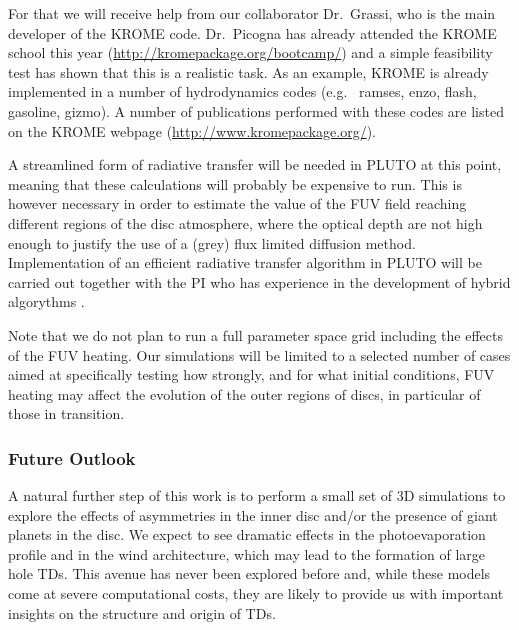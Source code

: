 \documentclass[10pt,fleqn,twoside]{article}
\begin{document}
 For 
that we will receive help from our collaborator Dr.\ Grassi, who is the main
developer of the KROME code. Dr.\ Picogna has already attended the KROME
school this year (\url{http://kromepackage.org/bootcamp/}) and a simple
feasibility test has shown that this is a realistic task. As an example,
KROME is already implemented in a number of hydrodynamics codes (e.g.\ {\sc
  ramses, enzo, flash, gasoline, gizmo}). A number of publications performed
with these codes are listed on the KROME webpage
(\url{http://www.kromepackage.org/}).

A streamlined form of radiative transfer
will be needed in PLUTO at this point, meaning that these calculations will
probably be expensive to run.  This is however necessary in order to
estimate the value of the  FUV field reaching different regions of the
disc atmosphere, where the optical depth are not high enough to
justify the use of a  (grey) flux limited diffusion method.
Implementation of an efficient radiative transfer algorithm in PLUTO
will be carried out together with the PI who has experience in the
development of hybrid algorythms 
\citep[e.g.,][]{2014ASSP...36..127O}.

Note that we do not plan to run a full
parameter space grid including the effects of the FUV heating. 
Our simulations will be limited to a selected number of cases
aimed at specifically testing how strongly, and for what initial
conditions, FUV heating may affect the evolution of the outer regions
of discs, in particular of those in transition.\\

\subsubsection{Future Outlook}

A natural further step of this work is to perform a small set of 3D
simulations to explore the effects of asymmetries in the inner
disc and/or the presence of giant planets in the disc. We expect to
see dramatic effects in the photoevaporation 
profile and in the wind architecture, which may lead to the formation
of large hole TDs. This avenue has never been explored before and,
while these models come at severe computational costs, they are likely to provide us
with important insights on the structure and origin of TDs. 
\end{document}
